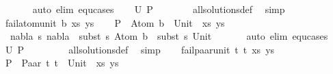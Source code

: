 \begin{isabellebody}
\ \ \ \ \ \isamarkupfalse%
\ {\isacharparenleft}{\kern0pt}auto\ elim{\isacharcolon}{\kern0pt}\ equ{\isachardot}{\kern0pt}cases{\isacharparenright}{\kern0pt}\isanewline
\ \ \isamarkupfalse%
\ {\isachardoublequoteopen}U\ {\isacharquery}{\kern0pt}P\ {\isacharequal}{\kern0pt}\ {\isacharbraceleft}{\kern0pt}{\isacharbraceright}{\kern0pt}{\isachardoublequoteclose}\isanewline
\ \ \ \ \isamarkupfalse%
\ all{\isacharunderscore}{\kern0pt}solutions{\isacharunderscore}{\kern0pt}def\ \isamarkupfalse%
\ simp\isanewline
{}\isamarkupfalse%
\isanewline
\ \ \isamarkupfalse%
\ {\isacharparenleft}{\kern0pt}fail{\isacharunderscore}{\kern0pt}atom{\isacharunderscore}{\kern0pt}unit\ b\ xs\ ys{\isacharparenright}{\kern0pt}\isanewline
\ \ \isamarkupfalse%
\ {\isacharquery}{\kern0pt}P\ {\isacharequal}{\kern0pt}\ {\isachardoublequoteopen}{\isacharparenleft}{\kern0pt}Atom\ b\ {\isasymapprox}{\isacharquery}{\kern0pt}\ Unit\ {\isacharhash}{\kern0pt}\ xs{\isacharcomma}{\kern0pt}\ ys{\isacharparenright}{\kern0pt}{\isachardoublequoteclose}\isanewline
\ \ \isamarkupfalse%
\ {\isachardoublequoteopen}{\isasymnexists}\ nabla\ s{\isachardot}{\kern0pt}\ nabla\ {\isasymturnstile}\ subst\ s\ {\isacharparenleft}{\kern0pt}Atom\ b{\isacharparenright}{\kern0pt}\ {\isasymapprox}\ subst\ s\ {\isacharparenleft}{\kern0pt}Unit{\isacharparenright}{\kern0pt}{\isachardoublequoteclose}\isanewline
\ \ \ \ \ \isamarkupfalse%
\ {\isacharparenleft}{\kern0pt}auto\ elim{\isacharcolon}{\kern0pt}\ equ{\isachardot}{\kern0pt}cases{\isacharparenright}{\kern0pt}\isanewline
\ \ \isamarkupfalse%
\ {\isachardoublequoteopen}U\ {\isacharquery}{\kern0pt}P\ {\isacharequal}{\kern0pt}\ {\isacharbraceleft}{\kern0pt}{\isacharbraceright}{\kern0pt}{\isachardoublequoteclose}\ \isanewline
\ \ \ \ \isamarkupfalse%
\ all{\isacharunderscore}{\kern0pt}solutions{\isacharunderscore}{\kern0pt}def\ \isamarkupfalse%
\ simp\isanewline
{}\isamarkupfalse%
\isanewline
\ \ \isamarkupfalse%
\ {\isacharparenleft}{\kern0pt}fail{\isacharunderscore}{\kern0pt}paar{\isacharunderscore}{\kern0pt}unit\ t{}\ t{}\ xs\ ys{\isacharparenright}{\kern0pt}\isanewline
\ \ \isamarkupfalse%
\ {\isacharquery}{\kern0pt}P\ {\isacharequal}{\kern0pt}\ {\isachardoublequoteopen}{\isacharparenleft}{\kern0pt}Paar\ t{}\ t{}\ {\isasymapprox}{\isacharquery}{\kern0pt}\ Unit\ {\isacharhash}{\kern0pt}\ xs{\isacharcomma}{\kern0pt}\ ys{\isacharparenright}{\kern0pt}{\isachardoublequoteclose}\isanewline

\end{isabellebody}
